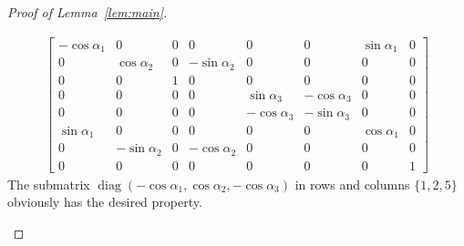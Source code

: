 \documentclass[reqno]{amsart}
\theoremstyle{definition} \newtheorem{example}[theorem]{Example}
\newcommand{\diag}{\operatorname{diag}}
\begin{document}
\begin{proof}[Proof of Lemma~\ref{lem:main}]
\begin{enumerate}[(a)]
\begin{align*}
\begin{bmatrix}
-\cos \alpha_1 & 0 & 0 & 0 & 0 & 0 & \sin \alpha_1 & 0\\
0 & \cos \alpha_2 & 0 & -\sin \alpha_2 & 0 & 0 & 0 & 0\\
0 & 0 & 1 & 0 & 0 & 0 & 0 & 0\\
0 & 0 & 0 & 0 & \sin \alpha_3 & -\cos \alpha_3 & 0 & 0\\
0 & 0 & 0 & 0 & -\cos \alpha_3 & -\sin \alpha_3 & 0 & 0\\
\sin \alpha_1 & 0 & 0 & 0 & 0 & 0 & \cos \alpha_1 & 0\\
0 & -\sin \alpha_2 & 0 & -\cos \alpha_2 & 0 & 0 & 0 & 0\\
0 & 0 & 0 & 0 & 0 & 0 & 0 & 1
\end{bmatrix}
\end{align*}
The submatrix $\diag(-\cos \alpha_1, \cos \alpha_2, -\cos \alpha_3)$ in rows and columns $\{1,2,5\}$ obviously has the desired property.


\end{enumerate}
\end{proof}
\end{document}
